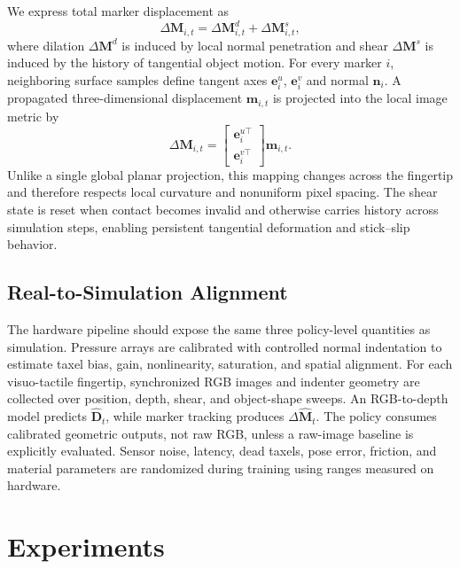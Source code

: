 \documentclass[10pt,twocolumn]{article}
\begin{document}
We express total marker displacement as
\begin{equation}
    \Delta\mathbf{M}_{i,t} =
    \Delta\mathbf{M}^{d}_{i,t}+
    \Delta\mathbf{M}^{s}_{i,t},
\end{equation}
where dilation $\Delta\mathbf{M}^{d}$ is induced by local normal penetration and
shear $\Delta\mathbf{M}^{s}$ is induced by the history of tangential object
motion.  For every marker $i$, neighboring surface samples define tangent axes
$\mathbf{e}^{u}_i$, $\mathbf{e}^{v}_i$ and normal $\mathbf{n}_i$.  A propagated
three-dimensional displacement $\mathbf{m}_{i,t}$ is projected into the local
image metric by
\begin{equation}
    \Delta\mathbf{M}_{i,t} =
    \begin{bmatrix}
    \mathbf{e}^{u\top}_i\\
    \mathbf{e}^{v\top}_i
    \end{bmatrix}
    \mathbf{m}_{i,t}.
\end{equation}
Unlike a single global planar projection, this mapping changes across the
fingertip and therefore respects local curvature and nonuniform pixel spacing.
The shear state is reset when contact becomes invalid and otherwise carries
history across simulation steps, enabling persistent tangential deformation and
stick--slip behavior.

\subsection{Real-to-Simulation Alignment}

The hardware pipeline should expose the same three policy-level quantities as
simulation.  Pressure arrays are calibrated with controlled normal indentation
to estimate taxel bias, gain, nonlinearity, saturation, and spatial alignment.
For each visuo-tactile fingertip, synchronized RGB images and indenter geometry
are collected over position, depth, shear, and object-shape sweeps.  An
RGB-to-depth model predicts $\hat{\mathbf{D}}_t$, while marker tracking produces
$\Delta\hat{\mathbf{M}}_t$.  The policy consumes calibrated geometric outputs,
not raw RGB, unless a raw-image baseline is explicitly evaluated.  Sensor noise,
latency, dead taxels, pose error, friction, and material parameters are
randomized during training using ranges measured on hardware.

\section{Experiments}
\label{sec:experiments}
\end{document}
